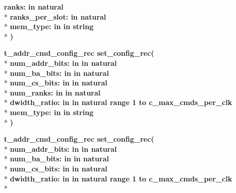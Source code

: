 \begin{DoxyCompactItemize}
{\bfseries \textcolor{vhdlchar}{ranks\+: }\textcolor{stringliteral}{in }{\bfseries \textcolor{comment}{natural}\textcolor{vhdlchar}{ }}}\\*
{\bfseries \textcolor{vhdlchar}{ranks\+\_\+per\+\_\+slot\+: }\textcolor{stringliteral}{in }{\bfseries \textcolor{comment}{natural}\textcolor{vhdlchar}{ }}}\\*
{\bfseries \textcolor{vhdlchar}{mem\+\_\+type\+: }\textcolor{stringliteral}{in }\textcolor{vhdlchar}{in string}}\\*
{\bfseries  )} 
\item 
{\bfseries {\bfseries \textcolor{vhdlchar}{t\+\_\+addr\+\_\+cmd\+\_\+config\+\_\+rec}\textcolor{vhdlchar}{ }}} {\bf set\+\_\+config\+\_\+rec}{\bfseries  ( }\\*
{\bfseries \textcolor{vhdlchar}{num\+\_\+addr\+\_\+bits\+: }\textcolor{stringliteral}{in }\textcolor{vhdlchar}{in natural}}\\*
{\bfseries \textcolor{vhdlchar}{num\+\_\+ba\+\_\+bits\+: }\textcolor{stringliteral}{in }\textcolor{vhdlchar}{in natural}}\\*
{\bfseries \textcolor{vhdlchar}{num\+\_\+cs\+\_\+bits\+: }\textcolor{stringliteral}{in }\textcolor{vhdlchar}{in natural}}\\*
{\bfseries \textcolor{vhdlchar}{num\+\_\+ranks\+: }\textcolor{stringliteral}{in }\textcolor{vhdlchar}{in natural}}\\*
{\bfseries \textcolor{vhdlchar}{dwidth\+\_\+ratio\+: }\textcolor{stringliteral}{in }\textcolor{vhdlchar}{in natural   range  1 to    c\+\_\+max\+\_\+cmds\+\_\+per\+\_\+clk}}\\*
{\bfseries \textcolor{vhdlchar}{mem\+\_\+type\+: }\textcolor{stringliteral}{in }\textcolor{vhdlchar}{in string}}\\*
{\bfseries  )} 
\item 
{\bfseries {\bfseries \textcolor{vhdlchar}{t\+\_\+addr\+\_\+cmd\+\_\+config\+\_\+rec}\textcolor{vhdlchar}{ }}} {\bf set\+\_\+config\+\_\+rec}{\bfseries  ( }\\*
{\bfseries \textcolor{vhdlchar}{num\+\_\+addr\+\_\+bits\+: }\textcolor{stringliteral}{in }\textcolor{vhdlchar}{in natural}}\\*
{\bfseries \textcolor{vhdlchar}{num\+\_\+ba\+\_\+bits\+: }\textcolor{stringliteral}{in }\textcolor{vhdlchar}{in natural}}\\*
{\bfseries \textcolor{vhdlchar}{num\+\_\+cs\+\_\+bits\+: }\textcolor{stringliteral}{in }\textcolor{vhdlchar}{in natural}}\\*
{\bfseries \textcolor{vhdlchar}{dwidth\+\_\+ratio\+: }\textcolor{stringliteral}{in }\textcolor{vhdlchar}{in natural   range  1 to    c\+\_\+max\+\_\+cmds\+\_\+per\+\_\+clk}}\\*

\end{DoxyCompactItemize}
